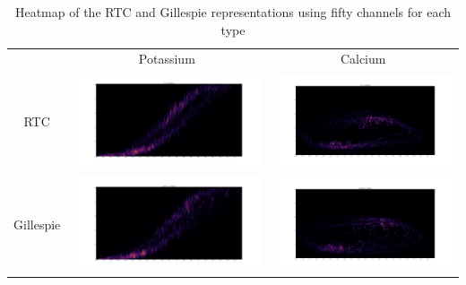 \begin{table}[]
    \centering
    \begin{tabular}{ccc}
    & Potassium & Calcium\\
    RTC &
    \includegraphics[width=.45\linewidth,valign=m]{Figures/50/K_RTC_.png} &
    \includegraphics[width=.45\linewidth,valign=m]{Figures/50/Ca_RTC_.png} \\
    Gillespie &
    \includegraphics[width=.45\linewidth,valign=m]{Figures/50/K_GILLESPIE_.png} &
    \includegraphics[width=.45\linewidth,valign=m]{Figures/50/Ca_GILLESPIE_.png} \\
    \end{tabular}
    \caption{Heatmap of the RTC and Gillespie representations using fifty channels for each type}
    \label{tab:my_label}
\end{table}

